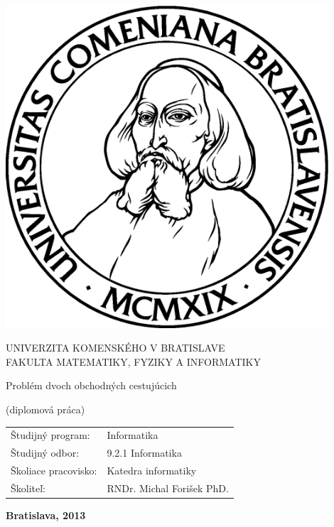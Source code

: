 \documentclass[12pt,a4paper]{report}
\begin{document}
\thispagestyle{empty}
\begin{minipage}{0.25\textwidth}
\includegraphics[width=0.9\textwidth]{img/komlogo-new}
\end{minipage}
\begin{minipage}{0.69\textwidth}
\begin{center}
UNIVERZITA KOMENSKÉHO V BRATISLAVE \\
FAKULTA MATEMATIKY, FYZIKY A INFORMATIKY \\
\end{center}
\end{minipage}

\vfill
\begin{center}
\begin{minipage}{0.8\textwidth}
\bigskip\medskip
\centerline{\LARGE\sc Problém dvoch obchodných cestujúcich}
\smallskip
\centerline{(diplomová práca)}
\bigskip
\bigskip
\bigskip\bigskip
\end{minipage}
\end{center}
\vfill
\begin{tabular}{l l}
Študijný program: & Informatika \\
Študijný odbor: & 9.2.1 Informatika \\
Školiace pracovisko: & Katedra informatiky \\
Školiteľ: & RNDr. Michal Forišek PhD. \\
\end{tabular}
\vfill
{\bf Bratislava, 2013}
\end{document}

